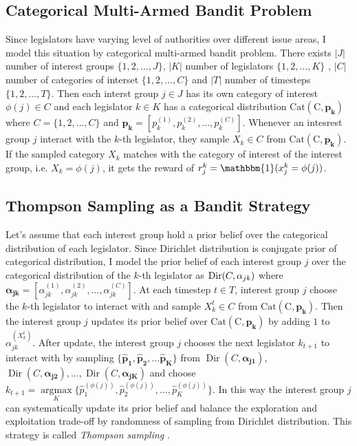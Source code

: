 \documentclass{article}
\begin{document}
\subsection{Categorical Multi-Armed Bandit Problem} \label{vanilla}
Since legislators have varying level of authorities over different issue areas,
I model this situation by categorical multi-armed bandit problem. There exists $|J|$ number of interest groups 
$\{1, 2, \hdots, J\}$, $|K|$ number of legislators $\{1, 2, \hdots, K\}$ 
, $|C|$ number of categories of interset $\{1,2, \hdots, C\}$ and
$|T|$ number of timesteps $\{1,2, \hdots, T\}$.  
Then each interst group $j \in J$ has its 
own category of interest $\phi(j) \in C$ and
each legislator $k \in K$ has a categorical distribution 
$\operatorname{Cat(C, \mathbf{p_k})}$ where
$C=\{1,2,\hdots, C\}$ and $\mathbf{p_k} = [p_k^{(1)}, p_k^{(2)}, \hdots, p_k^{(C)}]$.
Whenever an intesrest group $j$ interact with the $k$-th legislator, they
sample $X_k \in C$ from $\operatorname{Cat(C, \mathbf{p_k})}$.
If the sampled category $X_k$ matches with the category of interest of the interest group, i.e. 
$X_k = \phi(j)$,
it gets the reward of $r_j^k = \mathbbm{1}(x_j^{k} = \phi(j))$.

\subsection{Thompson Sampling as a Bandit Strategy}
Let's assume that 
each interest group
hold a prior belief over the 
categorical distribution of each legislator.
Since Dirichlet distribution is conjugate prior of categorical distribution,
I model the prior belief of each interest group $j$ over the categorical distribution of the $k$-th legislator as
$\operatorname{Dir}(C, \boldmath{\alpha}_{jk})$ where 
$\mathbf{\alpha_{jk}} = [\alpha_{jk}^{(1)}, \alpha_{jk}^{(2)}, \hdots, \alpha_{jk}^{(C)}]$.
At each timestep $t\in T$, interest group $j$ choose the $k$-th legislator to 
interact with and sample $X_k^t \in C$ from $\operatorname{Cat(C, \mathbf{p_k})}$.
Then the interest group $j$ updates its prior belief over $\operatorname{Cat(C, \mathbf{p_k})}$ by adding $1$ to $\alpha_{jk}^{(X_k^t)}$.
After update, the interest group $j$ chooses the next legislator $k_{t+1}$
to interact with by sampling $\{\mathbf{\hat{p}_1}, \mathbf{\hat{p}_2}, \hdots \mathbf{\hat{p}_K}\}$ from $\operatorname{Dir}(C, \mathbf{\alpha_{j1}})$,  $\operatorname{Dir}(C, \mathbf{\alpha_{j2}}), \hdots, \operatorname{Dir}(C, \mathbf{\alpha_{jK}})$ and
choose $k_{t+1} = \underset{K}{\operatorname{argmax}}\{\hat{p}^{(\phi(j))}_1, \hat{p}^{(\phi(j))}_2, \hdots, \hat{p}^{(\phi(j))}_K\}$.
In this way the interest group $j$ can systematically update
its prior belief and
balance the exploration and exploitation trade-off by 
randomness of sampling from Dirichlet distribution.
This strategy is called \textit{Thompson sampling} \citep{tom}.
\end{document}
